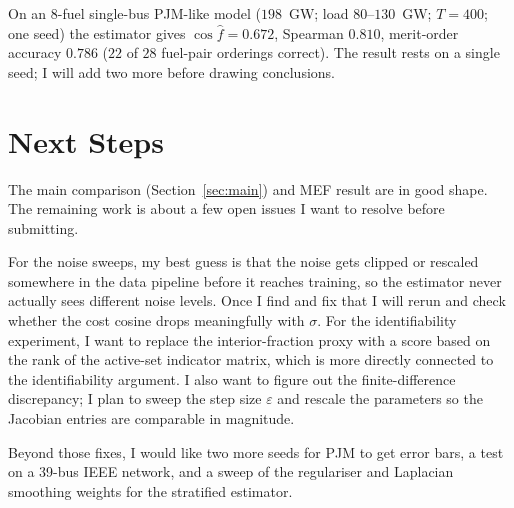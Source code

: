 \documentclass[10pt,letterpaper]{article}
\newcommand{\Cref}[1]{Section~\ref{#1}}
\begin{document}
On an 8-fuel single-bus PJM-like model ($198$~GW; load
$80$--$130$~GW; $T=400$; one seed) the estimator gives
$\cos\hat f = 0.672$, Spearman $0.810$, merit-order accuracy $0.786$
($22$ of $28$ fuel-pair orderings correct). The result rests on a
single seed; I will add two more before drawing conclusions.


\section{Next Steps}\label{sec:plan}

The main comparison (\Cref{sec:main}) and MEF result are in good
shape. The remaining work is about a few open
issues I want to resolve before submitting.

For the noise sweeps, my best guess is that the noise gets clipped
or rescaled somewhere in the data pipeline before it reaches training,
so the estimator never actually sees different noise levels. Once I
find and fix that I will rerun and check whether the cost cosine
drops meaningfully with $\sigma$. For the identifiability experiment,
I want to replace the interior-fraction proxy with a score based on
the rank of the active-set indicator matrix, which is more directly
connected to the identifiability argument. I also want to figure out
the finite-difference discrepancy; I plan to sweep the step size
$\varepsilon$ and rescale the parameters so the Jacobian entries are
comparable in magnitude.

Beyond those fixes, I would like two more seeds for PJM to get error
bars, a test on a 39-bus IEEE network, and a sweep of the regulariser
and Laplacian smoothing weights for the stratified estimator.
\end{document}
